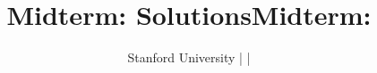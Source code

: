 \ifshow
	\newenvironment{floatInSolutions}[3][5.5in]{\begin{textblock*}{#1}(#2,#3) \begingroup \color{NavyBlue}}{\endgroup \end{textblock*}}
	\newenvironment{showInSolutions}{\begingroup \color{NavyBlue}}{\endgroup}
	\newenvironment{mcbox}[3][15]{\begin{pspicture}(0, 0)\psframe[linecolor = NavyBlue](0, #2)(#1, #3)}{\end{pspicture}}
	\title{Midterm: \partTitle{} Solutions}
	\newcommand{\correctOption}{\item[\rlap{$\bigcirc$}\ \textcolor{NavyBlue}{$\bullet$}\ ]}
	\newcommand{\incorrectOption}{\item [\rlap{$\bigcirc$}\ \textcolor{white}{$\bullet$}\ ]}
\else
	\title{Midterm: \partTitle{}}
	\newcommand{\correctOption}{\item[$\bigcirc$]}
	\newcommand{\incorrectOption}{\item[$\bigcirc$]}
\fi

\author{Stanford University | \course{} | \term{}}
\date{\examDate{}}

\maketitle
